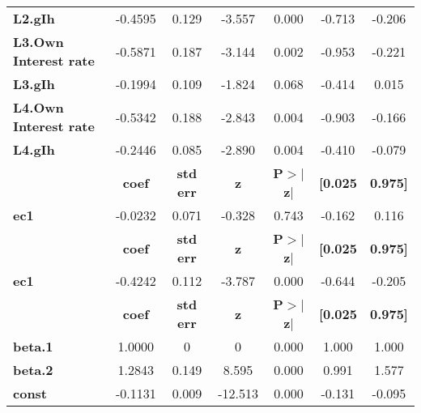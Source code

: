 \begin{center}
\begin{tabular}{lcccccc}
\textbf{L2.gIh}               &      -0.4595  &        0.129     &    -3.557  &         0.000        &       -0.713    &       -0.206     \\
\textbf{L3.Own Interest rate} &      -0.5871  &        0.187     &    -3.144  &         0.002        &       -0.953    &       -0.221     \\
\textbf{L3.gIh}               &      -0.1994  &        0.109     &    -1.824  &         0.068        &       -0.414    &        0.015     \\
\textbf{L4.Own Interest rate} &      -0.5342  &        0.188     &    -2.843  &         0.004        &       -0.903    &       -0.166     \\
\textbf{L4.gIh}               &      -0.2446  &        0.085     &    -2.890  &         0.004        &       -0.410    &       -0.079     \\
             & \textbf{coef} & \textbf{std err} & \textbf{z} & \textbf{P$> |$z$|$} & \textbf{[0.025} & \textbf{0.975]}  \\
\midrule
\textbf{ec1} &      -0.0232  &        0.071     &    -0.328  &         0.743        &       -0.162    &        0.116     \\
             & \textbf{coef} & \textbf{std err} & \textbf{z} & \textbf{P$> |$z$|$} & \textbf{[0.025} & \textbf{0.975]}  \\
\midrule
\textbf{ec1} &      -0.4242  &        0.112     &    -3.787  &         0.000        &       -0.644    &       -0.205     \\
                & \textbf{coef} & \textbf{std err} & \textbf{z} & \textbf{P$> |$z$|$} & \textbf{[0.025} & \textbf{0.975]}  \\
\midrule
\textbf{beta.1} &       1.0000  &            0     &         0  &         0.000        &        1.000    &        1.000     \\
\textbf{beta.2} &       1.2843  &        0.149     &     8.595  &         0.000        &        0.991    &        1.577     \\
\textbf{const}  &      -0.1131  &        0.009     &   -12.513  &         0.000        &       -0.131    &       -0.095     \\
\bottomrule
\end{tabular}
\end{center}